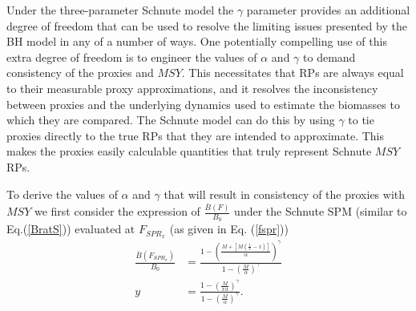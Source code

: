 %
Under the three-parameter Schnute model the $\gamma$ parameter provides an 
additional degree of freedom that can be used to resolve the limiting 
issues presented by the BH model in any of a number of ways. 
One potentially compelling use of this extra degree of freedom is to  
engineer the values of $\alpha$ and $\gamma$ to demand consistency of 
the proxies and $MSY$.
This necessitates that RPs are always equal to their measurable proxy approximations, 
and it resolves the inconsistency between proxies and the underlying dynamics 
used to estimate the biomasses to which they are compared. The Schnute model 
can do this by using $\gamma$ to tie proxies directly to the true RPs that 
they are intended to approximate. This makes the proxies easily calculable quantities 
that truly represent Schnute $MSY$ RPs. 

%
To derive the values of $\alpha$ and $\gamma$ that will result in consistency of
the proxies with $MSY$ we first consider the expression of $\frac{\bar B(F)}{B_0}$ 
under the Schnute SPM (similar to Eq.(\ref{BratS})) evaluated at $F_{SPR_x}$ (as given in Eq. (\ref{fspr})) %
%
\begin{align}
	\frac{\bar B(F_{SPR_x})}{B_0} &= \frac{1-\left(\frac{M+\left[M\left(\frac{1}{x}-1\right)\right]}{\alpha}\right)^\gamma}{ 1-\left(\frac{M}{\alpha}\right)^\gamma } \nonumber\\
	y&=\frac{1-\left(\frac{M}{x\alpha}\right)^\gamma}{ 1-\left(\frac{M}{\alpha}\right)^\gamma } \label{why}.
\end{align}

